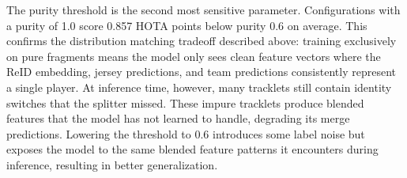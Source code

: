 
The purity threshold is the second most sensitive parameter. Configurations with a purity of 1.0 score 0.857 HOTA points below purity 0.6 on average. This confirms the distribution matching tradeoff described above: training exclusively on pure fragments means the model only sees clean feature vectors where the ReID embedding, jersey predictions, and team predictions consistently represent a single player. At inference time, however, many tracklets still contain identity switches that the splitter missed. These impure tracklets produce blended features that the model has not learned to handle, degrading its merge predictions. Lowering the threshold to 0.6 introduces some label noise but exposes the model to the same blended feature patterns it encounters during inference, resulting in better generalization.
